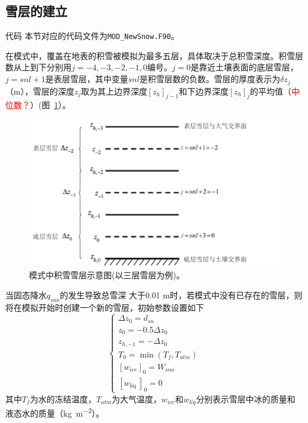 \subsection{雪层的建立}
\begin{mymdframed}{代码}
本节对应的代码文件为\texttt{MOD\_NewSnow.F90}。
\end{mymdframed}

在模式中，覆盖在地表的积雪被模拟为最多五层，具体取决于总积雪深度。积雪层数从上到下分别用$j = −4, −3, −2, −1, 0$编号。$j = 0$是靠近土壤表面的底层雪层，$j = snl + 1$是表层雪层，其中变量$snl$是积雪层数的负数。雪层的厚度表示为$\delta z_j$（m），雪层的深度$z_j$取为其上边界深度$\left[z_h\right]_{j-1}$和下边界深度$\left[z_h\right]_j$的平均值（\textcolor{red}{中位数？}）(图~\ref{fig:模式中积雪雪层示意图}）。

{
\begin{figure}[htbp]
\centering
\includegraphics{Figures/雪盖土壤热力过程/模式中积雪雪层示意图.png}
\caption{模式中积雪雪层示意图(以三层雪层为例)。}
\label{fig:模式中积雪雪层示意图}
\end{figure}
}

当固态降水$q_{sno}$的发生导致总雪深 大于0.01 m时，若模式中没有已存在的雪层，则将在模拟开始时创建一个新的雪层，初始参数设置如下
\begin{equation}
\left\{\begin{array}{c}\Delta z_{0}={d}_{{sn}} \\ z_{0}=-0.5 \Delta z_{0} \\ z_{{h},-1}=-\Delta z_{0} \\ T_{0}=\min \left(T_{{f}}, T_{{atm}}\right) \\ {\left[{w}_{{ice}}\right]_{0}={W}_{{sno}}} \\ {\left[{w}_{\text {liq }}\right]_{0}=0}\end{array}\right.
\end{equation}
其中$T_f$为水的冻结温度，$T_{atm}$为大气温度，$w_{ice}$和$w_{liq}$分别表示雪层中冰的质量和液态水的质量（\unit{kg.m^{-2}}）。


